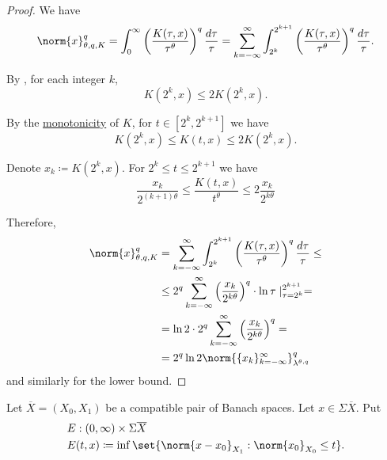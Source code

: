\begin{proof}
  We have
  \begin{equation*}
    \norm{x}_{\theta,q,K}^q
    =
    \int_0^\infty \left( \frac {K(\tau, x)} {\tau^\theta} \right)^q \frac {d\tau} \tau
    =
    \sum_{k=-\infty}^\infty \int_{2^k}^{2^{k+1}} \left( \frac {K(\tau, x)} {\tau^\theta} \right)^q \frac {d\tau} \tau.
  \end{equation*}

  By , for each integer \( k \),
  \begin{equation*}
    K(2^k, x) \leq 2 K(2^k, x).
  \end{equation*}

  By the \hyperref[def:k_functional_properties/basic]{monotonicity} of \( K \), for \( t \in [2^k, 2^{k+1}] \) we have
  \begin{equation*}
    K(2^k, x) \leq K(t, x) \leq 2 K(2^k, x).
  \end{equation*}

  Denote \( x_k \coloneqq K(2^k, x) \). For \( 2^k \leq t \leq 2^{k+1} \) we have
  \begin{equation*}
    \frac{x_k}{2^{(k+1)\theta}} \leq \frac{K(t, x)}{t^\theta} \leq 2 \frac{x_k}{2^{k\theta}}
  \end{equation*}

  Therefore,
  \begin{align*}
    \norm{x}_{\theta,q,K}^q
    &=
    \sum_{k=-\infty}^\infty \int_{2^k}^{2^{k+1}} \left( \frac {K(\tau, x)} {\tau^\theta} \right)^q \frac {d\tau} \tau
    \leq \\ &\leq
    2^q \sum_{k=-\infty}^\infty \left(\frac{x_k}{2^{k\theta}} \right)^q \cdot \ln \tau \mid_{\tau=2^k}^{2^{k+1}}
    = \\ &=
    \ln 2 \cdot 2^q \sum_{k=-\infty}^\infty \left(\frac{x_k}{2^{k\theta}} \right)^q
    = \\ &=
    2^q \ln 2 \norm{\{ x_k \}_{k=-\infty}^\infty}_{\lambda^{\theta,q}}^q
  \end{align*}
  and similarly for the lower bound.
\end{proof}

\begin{definition}\label{def:e_functional}
  Let \( \overline{X} = (X_0, X_1) \) be a compatible pair of Banach spaces. Let \( x \in \Sigma \overline{X} \). Put
  \begin{equation}\label{eq:def:e_functional}
    \begin{aligned}
      &E: (0, \infty) \times {\Sigma \overline{X}} \\
      &E(t, x) \coloneqq \inf \set{ \norm{x - x_0}_{X_1} : \norm{x_0}_{X_0} \leq t }.
    \end{aligned}
  \end{equation}
\end{definition}

